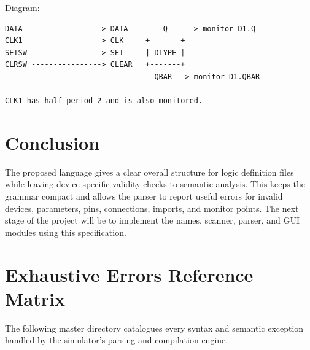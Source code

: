 \documentclass[10pt,a4paper]{article}
\begin{document}
Diagram:

\begin{verbatim}
DATA  ----------------> DATA        Q -----> monitor D1.Q
CLK1  ----------------> CLK     +-------+
SETSW ----------------> SET     | DTYPE |
CLRSW ----------------> CLEAR   +-------+
                                  QBAR --> monitor D1.QBAR

CLK1 has half-period 2 and is also monitored.
\end{verbatim}

\section{Conclusion}

The proposed language gives a clear overall structure for logic definition
files while leaving device-specific validity checks to semantic analysis. This
keeps the grammar compact and allows the parser to report useful errors for
invalid devices, parameters, pins, connections, imports, and monitor points.
The next stage of the project will be to implement the names, scanner, parser,
and GUI modules using this specification.

\newpage
\appendix
\section{Exhaustive Errors Reference Matrix}

The following master directory catalogues every syntax and semantic exception handled by the simulator's parsing and compilation engine.
\end{document}
